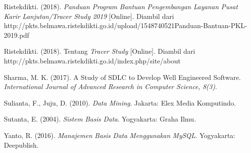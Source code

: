 \documentclass{jtetiskripsi}
\begin{document}
\begin{thebibliography}{99}
 Ristekdikti. (2018). \textit{Panduan Program Bantuan Pengembangan Layanan Pusat Karir Lanjutan/Tracer Study 2019} [Online]. Diambil dari http://pkts.belmawa.ristekdikti.go.id/upload/1548740521Panduan-Bantuan-PKL-2019.pdf

 Ristekdikti. (2018). Tentang \textit{Tracer Study} [Online]. Diambil dari http://pkts.belmawa.ristekdikti.go.id/index.php/site/about

 Sharma, M. K. (2017). A Study of SDLC to Develop Well Engineered Software. \textit{International Journal of Advanced Research in Computer Science, 8(3)}.

 Sulianta, F., Juju, D. (2010). \textit{Data Mining}. Jakarta: Elex Media Komputindo.

 Sutanta, E. (2004). \textit{Sistem Basis Data}. Yogyakarta: Graha Ilmu.

 Yanto, R. (2016). \textit{Manajemen Basis Data Menggunakan MySQL}. Yogyakarta: Deepublish.

	
		
	
\end{thebibliography}



\end{document}
